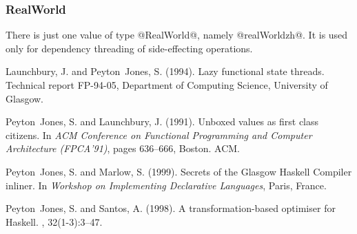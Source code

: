 \documentclass[10pt]{article}
\begin{document}
\newcommand{\primopdesc}[8]{
\par\noindent{\texttt{{{#3} :: {#6}}}}
\\{#7} {#8}\\} 

\newcommand{\primtypespec}[4]{
\par\noindent{Primitive type: \texttt{{#2}}}
\\{#3} {#4}\\}

\newcommand{\pseudoopspec}[5]{
\par\noindent{\texttt{{{#1} :: {#3}}}}
\\{#4} {#5}\\}



\subsubsection{RealWorld}

There is just one value of type @RealWorld@, namely @realWorldzh@. It is used
only for dependency threading of side-effecting operations.

\begin{thebibliography}{}

Launchbury, J. and {Peyton~Jones}, S. (1994).
\newblock Lazy functional state threads.
\newblock Technical report FP-94-05, Department of Computing Science,
  University of Glasgow.

{Peyton~Jones}, S. and Launchbury, J. (1991).
\newblock Unboxed values as first class citizens.
\newblock In {\em ACM Conference on Functional Programming and Computer
  Architecture (FPCA'91)}, pages 636--666, Boston. ACM.

{Peyton~Jones}, S. and Marlow, S. (1999).
\newblock Secrets of the {Glasgow Haskell Compiler} inliner.
\newblock In {\em Workshop on Implementing Declarative Languages}, Paris,
  France.

Peyton~Jones, S. and Santos, A. (1998).
\newblock A transformation-based optimiser for {Haskell}.
, 32(1-3):3--47.

\end{thebibliography}
\end{document}
